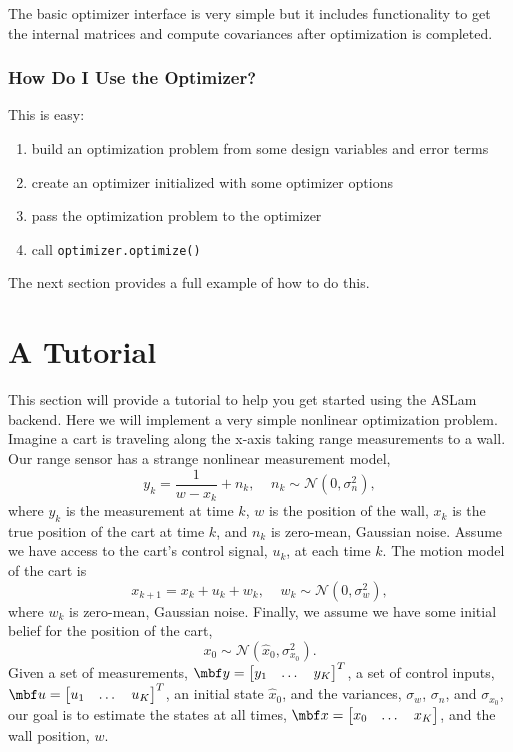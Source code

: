 \documentclass[11pt,a4,oneside]{article}
\newcommand{\txt}[1]{{\footnotesize\texttt{#1}}}
\newcommand{\listcpp}[2]{}
\begin{document}
The basic optimizer interface is very simple but it includes functionality to get the internal matrices and compute covariances after optimization is completed.
\listcpp{Optimizer2.hpp}{../../aslam_backend/include/aslam/backend/Optimizer2.hpp}

\subsubsection{How Do I Use the Optimizer?}
This is easy:
\begin{enumerate}
\item build an optimization problem from some design variables and error terms
\item create an optimizer initialized with some optimizer options
\item pass the optimization problem to the optimizer
\item call \txt{optimizer.optimize()}
\end{enumerate}
The next section provides a full example of how to do this.
\section{A Tutorial}
This section will provide a tutorial to help you get started using the ASLam backend. Here we will implement a very simple nonlinear optimization problem. Imagine a cart is traveling along the x-axis taking range measurements to a wall. Our range sensor has a strange nonlinear measurement model,
\begin{equation}
  \label{eq:range-nonlinear}
  y_k = \frac{1}{w - x_k} + n_k,\;\;\;\;n_k \sim \mathcal{N}(0, \sigma_{n}^2),
\end{equation}
where $y_k$ is the measurement at time $k$, $w$ is the position of the wall, $x_k$ is the true position of the cart at time $k$, and $n_k$ is zero-mean, Gaussian noise. Assume we have access to the cart's control signal, $u_k$, at each time $k$. The motion model of the cart is
\begin{equation}
  \label{eq:motion-model}
  x_{k+1} = x_k + u_k + w_k,\;\;\;\; w_k \sim \mathcal{N}(0, \sigma_{w}^2),
\end{equation}
where $w_k$ is zero-mean, Gaussian noise. Finally, we assume we have some initial belief for the position of the cart,
\begin{equation}
  \label{eq:cart-belief}
  x_0 \sim \mathcal{N}(\hat x_0, \sigma_{x_0}^2).
\end{equation}
Given a set of measurements, $\mbf y = \bbm y_1 & \dots & y_K \ebm^T$, a set of control inputs, $\mbf u = \bbm u_1 & \dots & u_K \ebm^T$, an initial state $\hat x_0$, and the variances, $\sigma_w$, $\sigma_n$, and $\sigma_{x_0}$, our goal is to estimate the states at all times, $\mbf x = \bbm x_0 & \dots & x_K \ebm$, and the wall position, $w$.
\end{document}
